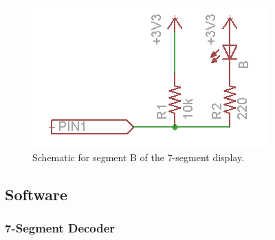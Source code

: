 \documentclass[11pt]{article}
\begin{document}
\begin{figure}[h!]
\centering
\includegraphics[scale=0.7]{single_led.png}
\caption{Schematic for segment B of the 7-segment display.}
\label{figure:single_led}
\end{figure} 


\subsection{Software}

\subsubsection{7-Segment Decoder}
\label{sec:software_7seg}
\end{document}
